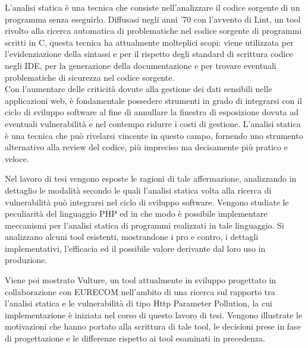 L'analisi statica è una tecnica che consiste nell'analizzare il codice sorgente di un programma senza eseguirlo. Diffusasi negli anni '70 con l'avvento di Lint, un tool rivolto alla ricerca automatica di problematiche nel codice sorgente di programmi scritti in C, questa tecnica ha attualmente molteplici scopi: viene utilizzata per l'evidenziazione della sintassi e per il rispetto degli standard di scrittura codice negli IDE, per la generazione della documentazione e per trovare eventuali problematiche di sicurezza nel codice sorgente.\\
Con l'aumentare delle criticità dovute alla gestione dei dati sensibili nelle applicazioni web, è fondamentale possedere strumenti in grado di integrarsi con il ciclo di sviluppo software al fine di annullare la finestra di esposizione dovuta ad eventuali vulnerabilità e nel contempo ridurre i costi di gestione. L'analisi statica è una tecnica che può rivelarsi vincente in questo campo, fornendo uno strumento alternativo alla review del codice, più impreciso ma decisamente più pratico e veloce.

Nel lavoro di tesi vengono esposte le ragioni di tale affermazione, analizzando in dettaglio le modalità secondo le quali l'analisi statica volta alla ricerca di vulnerabilità può integrarsi nel ciclo di sviluppo software. Vengono studiate le peculiarità del linguaggio PHP ed in che modo è possibile implementare meccanismi per l'analisi statica di programmi realizzati in tale linguaggio. Si analizzano alcuni tool esistenti, mostrandone i pro e contro, i dettagli implementativi, l'efficacia ed il possibile valore derivante dal loro uso in produzione.

Viene poi mostrato Vulture, un tool attualmente in sviluppo progettato in collaborazione con EURECOM nell'ambito di una ricerca sul rapporto tra l'analisi statica e le vulnerabilità di tipo Http Parameter Pollution, la cui implementazione è iniziata nel corso di questo lavoro di tesi. Vengono illustrate le motivazioni che hanno portato alla scrittura di tale tool, le decisioni prese in fase di progettazione e le differenze rispetto ai tool esaminati in precedenza.